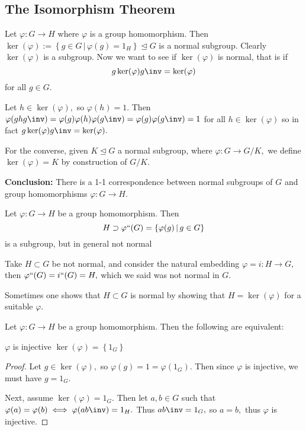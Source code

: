 \documentclass{article}
\begin{document}
\subsection{The Isomorphism Theorem}

Let $\varphi:G\to H$ where $\varphi$ is a group homomorphism. Then $\ker(\varphi):=\left\{ g\in G\, |\, \varphi(g)=1_H \right\}\unlhd G$ is a normal subgroup. Clearly $\ker(\varphi)$ is a subgroup. Now we want to see if $\ker(\varphi)$ is normal, that is if \[g\ker(\varphi)g\inv=\ker(\varphi)\] for all $g\in G.$ 

Let $h\in\ker(\varphi),$ so $\varphi(h)=1.$ Then $\varphi(ghg\inv)=\varphi(g)\varphi(h)\varphi(g\inv)=\varphi(g)\varphi(g\inv)=1$ for all $h\in\ker(\varphi)$ so in fact $g\ker(\varphi)g\inv=\ker(\varphi).$

For the converse, given $K\unlhd G$ a normal subgroup, where $\varphi:G\to G/K,$ we define $\ker(\varphi)=K$ by construction of $G/K.$

\textbf{Conclusion:} There is a 1-1 correspondence between normal subgroups of $G$ and group homomorphisms $\varphi:G\to H.$

\begin{example*}
	Let $\varphi:G\to H$ be a group homomorphism. Then \[H\supset \varphi``(G)=\left\{ \varphi(g)\, |\, g\in G \right\}\] is a subgroup, but in general not normal
\end{example*}

\begin{example*}
	Take $H\subset G$ be not normal, and consider the natural embedding $\varphi=i:H\to G,$ then $\varphi``(G)=i``(G)=H,$ which we said was not normal in $G.$
\end{example*}

\begin{remark*}
	Sometimes one shows that $H\subset G$ is normal by showing that $H=\ker(\varphi)$ for a suitable $\varphi.$
\end{remark*}

\begin{theorem}
	Let $\varphi:G\to H$ be a group homomorphism. Then the following are equivalent:
	\begin{itemize}
		\ii $\varphi$ is injective
		\ii $\ker(\varphi)=\left\{ 1_G \right\}$
	\end{itemize}
\end{theorem}

\begin{proof}
	Let $g\in\ker(\varphi),$ so $\varphi(g)=1=\varphi(1_G).$ Then since $\varphi$ is injective, we must have $g=1_G.$

	Next, assume $\ker(\varphi)=1_G.$ Then let $a, b\in G$ such that $\varphi(a)=\varphi(b)\iff \varphi(ab\inv)=1_H.$ Thus $ab\inv=1_G,$ so $a=b,$ thus $\varphi$ is injective.
	
\end{proof}
\end{document}

